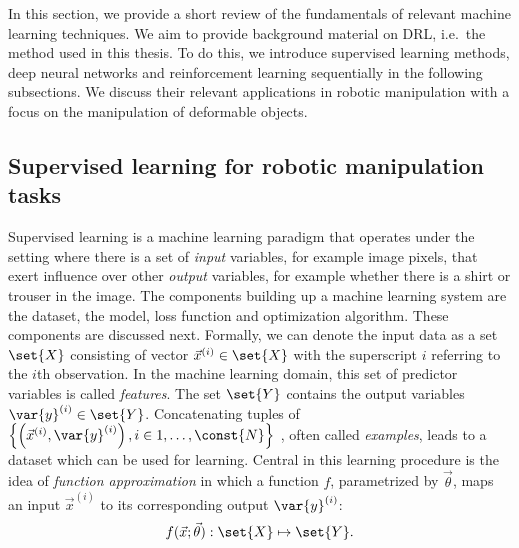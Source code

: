 \documentclass[\home/main.tex]{subfiles}
\begin{document}
In this section, we provide a short review of the fundamentals of relevant machine learning techniques. We aim to provide background material on \gls{DRL}, i.e.\ the method used in this thesis. To do this, we introduce supervised learning methods, deep neural networks and reinforcement learning sequentially in the following subsections. We discuss their relevant applications in robotic manipulation with a focus on the manipulation of deformable objects. %

\subsection{Supervised learning for robotic manipulation tasks} \label{subsec:lit_sl}
Supervised learning is a machine learning paradigm that operates under the setting where there is a set of \textit{input} variables, for example image pixels, that exert influence over other \textit{output} variables, for example whether there is a shirt or trouser in the image.
The components building up a machine learning system are the dataset, the model, loss function and optimization algorithm. These components are discussed next. 
Formally, we can denote the input data as a set $\set{X}$ consisting of vector $\vec{x}^{(i)} \in \set{X} $ with the superscript $i$ referring to the $i$th observation. In the machine learning domain, this set of predictor variables is called \textit{features}. The set $\set{Y}$ contains the output variables $\var{y}^{(i)} \in \set{Y}$. Concatenating tuples of
$\left\{\left(\vec{x}^{(i)}, \var{y}^{(i)}\right) , i \in 1,\dots,\const{N} \right\}$
, often called \textit{examples}, leads to a dataset which can be used for learning. Central in this learning procedure is the idea of \textit{function approximation} in which a function $f$, parametrized by $\vec{\theta}$, maps an input $\vec{x}^{(i)}$ to its corresponding output $\var{y}^{(i)}$:
\begin{equation*}
	f(\vec{x};\vec{\theta}): \set{X} \mapsto \set{Y}\text{.}
\end{equation*}
\end{document}

